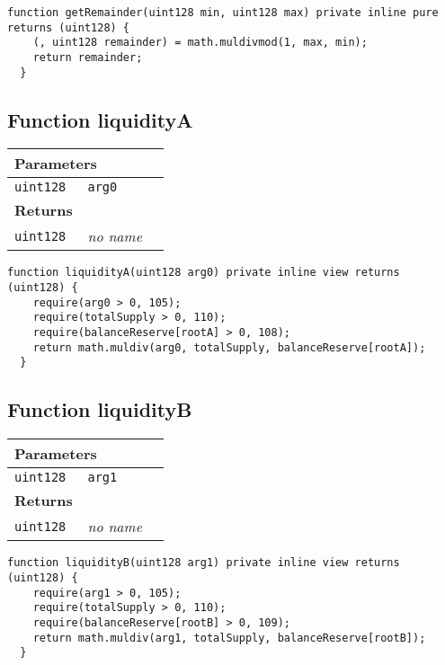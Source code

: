 \vspace{2cm}

\begin{lstlisting}[firstnumber=171]
  function getRemainder(uint128 min, uint128 max) private inline pure returns (uint128) {
    (, uint128 remainder) = math.muldivmod(1, max, min);
    return remainder;
  }
\end{lstlisting}

\subsection{Function liquidityA}


\ifsoltables
\noindent\begin{tabular}{|l|l|p{5cm}|}\hline
\multicolumn{3}{|l|}{\bf Parameters}\\\hline
\tt uint128 & \tt arg0 &\\\hline
\multicolumn{3}{|l|}{\bf Returns}\\\hline
\tt uint128 & {\em no name} &\\\hline
\end{tabular}
\fi

\vspace{2cm}

\begin{lstlisting}[firstnumber=191]
  function liquidityA(uint128 arg0) private inline view returns (uint128) {
    require(arg0 > 0, 105);
    require(totalSupply > 0, 110);
    require(balanceReserve[rootA] > 0, 108);
    return math.muldiv(arg0, totalSupply, balanceReserve[rootA]);
  }
\end{lstlisting}

\subsection{Function liquidityB}


\ifsoltables
\noindent\begin{tabular}{|l|l|p{5cm}|}\hline
\multicolumn{3}{|l|}{\bf Parameters}\\\hline
\tt uint128 & \tt arg1 &\\\hline
\multicolumn{3}{|l|}{\bf Returns}\\\hline
\tt uint128 & {\em no name} &\\\hline
\end{tabular}
\fi

\vspace{2cm}

\begin{lstlisting}[firstnumber=199]
  function liquidityB(uint128 arg1) private inline view returns (uint128) {
    require(arg1 > 0, 105);
    require(totalSupply > 0, 110);
    require(balanceReserve[rootB] > 0, 109);
    return math.muldiv(arg1, totalSupply, balanceReserve[rootB]);
  }
\end{lstlisting}

